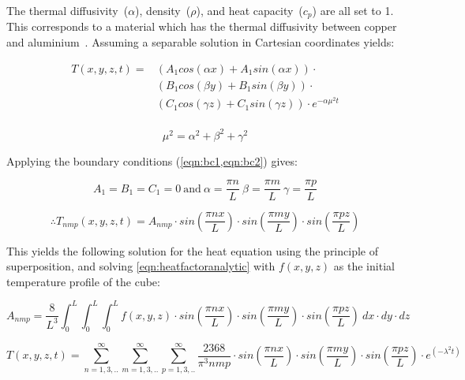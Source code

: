 The thermal diffusivity~($\alpha$), density~($\rho$), and heat capacity~($c_p$) are all set to 1. This corresponds to a material which has the thermal diffusivity between copper and aluminium~\cite{casalegno2010measurement,maccormack1997measurements}. Assuming a separable solution in Cartesian coordinates yields:

\begin{equation}
\begin{split}
T(x,y,z,t)=&(A_1 cos(\alpha x) + A_1 sin(\alpha x))\cdot\\
&(B_1 cos(\beta y) + B_1 sin(\beta y))\cdot\\
&(C_1 cos(\gamma z) + C_1 sin(\gamma z))\cdot e^{-\alpha\mu^2t}\\
\end{split} 
\end{equation}

\begin{equation}
\mu^2=\alpha^2+\beta^2+\gamma^2
\end{equation}

Applying the boundary conditions (\cref{eqn:bc1,eqn:bc2}) gives:

\begin{equation}
A_1=B_1=C_1=0\
\text{and}\ \alpha=\frac{\pi n}{L}\ \beta=\frac{\pi m}{L}\ \gamma=\frac{\pi p}{L}
\end{equation}

\begin{equation}
\therefore  T_{nmp}(x,y,z,t)=A_{nmp}\cdot sin\left(\frac{\pi n x}{L}\right)\cdot sin\left(\frac{\pi m y}{L}\right)\cdot sin\left(\frac{\pi p z}{L}\right)
\end{equation}

This yields the following solution for the heat equation using the principle of superposition, and solving \cref{eqn:heatfactoranalytic} with $f(x,y,z)$ as the initial temperature profile of the cube:

\begin{equation}
A_{nmp}=\frac{8}{L^3}\int_0^L\int_0^L\int_0^L f(x,y,z)\cdot sin(\frac{\pi n x}{L})\cdot sin(\frac{\pi m y}{L})\cdot sin(\frac{\pi p z}{L})\ dx\cdot dy\cdot dz
\label{eqn:heatfactoranalytic}
\end{equation}

\begin{equation}
T(x,y,z,t)=\sum^\infty_{n=1,3,..}\sum^\infty_{m=1,3,..}\sum^\infty_{p=1,3,..}\frac{2368}{\pi^3nmp}\cdot sin(\frac{\pi n x}{L})\cdot sin(\frac{\pi m y}{L})\cdot sin(\frac{\pi p z}{L})\cdot e^{(-\lambda^2t)}
\end{equation}

